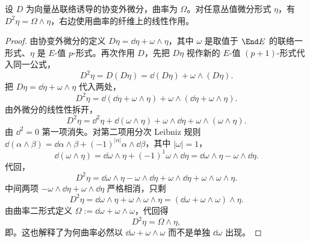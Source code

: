 \begin{lemma}[协变外微分的平方]
设 $D$ 为向量丛联络诱导的协变外微分，曲率为 $\Omega$。对任意丛值微分形式 $\eta$，有 $D^2\eta=\Omega\wedge\eta$，右边使用曲率的纤维上的线性作用。
\end{lemma}
\begin{proof}
由协变外微分的定义 $D\eta=\dd\eta+\omega\wedge\eta$，其中 $\omega$ 是取值于 $\End E$ 的联络一形式、$\eta$ 是 $E$-值 $p$-形式。再次作用 $D$，先把 $D\eta$ 视作新的 $E$-值 $(p+1)$-形式代入同一公式，
\begin{equation*}
D^2\eta
=D(D\eta)
=\dd(D\eta)+\omega\wedge(D\eta).
\end{equation*}
把 $D\eta=\dd\eta+\omega\wedge\eta$ 代入两处，
\begin{equation*}
D^2\eta
=\dd(\dd\eta+\omega\wedge\eta)
 +\omega\wedge(\dd\eta+\omega\wedge\eta).
\end{equation*}
由外微分的线性性拆开，
\begin{equation*}
D^2\eta
=\dd^2\eta+\dd(\omega\wedge\eta)
 +\omega\wedge\dd\eta+\omega\wedge(\omega\wedge\eta).
\end{equation*}
由 $\dd^2=0$ 第一项消失。对第二项用分次 Leibniz 规则 $\dd(\alpha\wedge\beta)=\dd\alpha\wedge\beta+(-1)^{|\alpha|}\alpha\wedge\dd\beta$，其中 $|\omega|=1$，
\begin{equation*}
\dd(\omega\wedge\eta)
=\dd\omega\wedge\eta+(-1)^1\omega\wedge\dd\eta
=\dd\omega\wedge\eta-\omega\wedge\dd\eta.
\end{equation*}
代回，
\begin{equation*}
D^2\eta
=\dd\omega\wedge\eta-\omega\wedge\dd\eta
 +\omega\wedge\dd\eta+\omega\wedge\omega\wedge\eta.
\end{equation*}
中间两项 $-\omega\wedge\dd\eta+\omega\wedge\dd\eta$ 严格相消，只剩
\begin{equation*}
D^2\eta
=\dd\omega\wedge\eta+\omega\wedge\omega\wedge\eta
=(\dd\omega+\omega\wedge\omega)\wedge\eta.
\end{equation*}
由曲率二形式定义 $\Omega:=\dd\omega+\omega\wedge\omega$，代回得
\begin{equation*}
D^2\eta=\Omega\wedge\eta,
\end{equation*}
即。这也解释了为何曲率必然以 $\dd\omega+\omega\wedge\omega$ 而不是单独 $\dd\omega$ 出现。
\end{proof}

